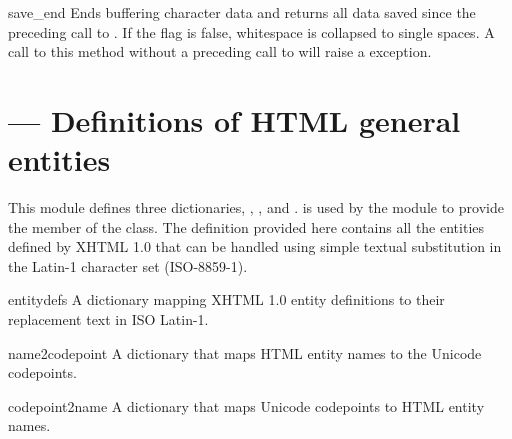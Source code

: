 \begin{methoddesc}{save_end}{}
Ends buffering character data and returns all data saved since the
preceding call to .  If the  flag is
false, whitespace is collapsed to single spaces.  A call to this
method without a preceding call to  will raise a
 exception.
\end{methoddesc}



\section{ ---
         Definitions of HTML general entities}


This module defines three dictionaries, ,
, and .  is
used by the  module to provide the
 member of the  class.  The
definition provided here contains all the entities defined by XHTML 1.0 
that can be handled using simple textual substitution in the Latin-1
character set (ISO-8859-1).


\begin{datadesc}{entitydefs}
  A dictionary mapping XHTML 1.0 entity definitions to their
  replacement text in ISO Latin-1.

\end{datadesc}

\begin{datadesc}{name2codepoint}
  A dictionary that maps HTML entity names to the Unicode codepoints.
\end{datadesc}

\begin{datadesc}{codepoint2name}
  A dictionary that maps Unicode codepoints to HTML entity names.
\end{datadesc}
